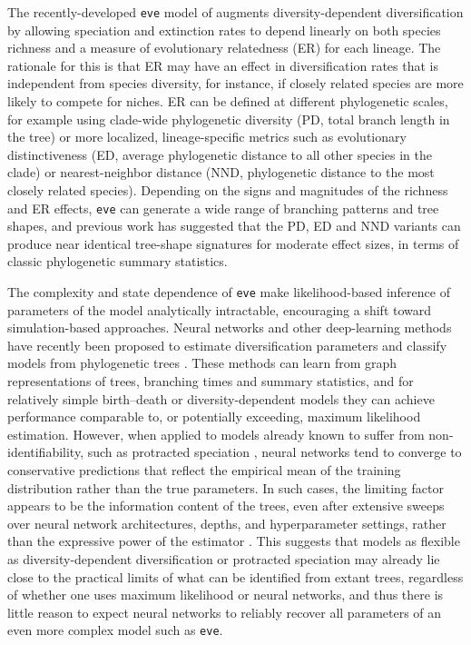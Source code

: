 {The recently-developed \texttt{eve} model of \citet{qin_impact_2025} augments diversity-dependent diversification by allowing speciation and extinction rates to depend linearly on both species richness and a measure of evolutionary relatedness (ER) for each lineage. The rationale for this is that ER may have an effect in diversification rates that is independent from species diversity, for instance, if closely related species are more likely to compete for niches. ER can be defined at different phylogenetic scales, for example using clade-wide phylogenetic diversity (PD, total branch length in the tree) or more localized, lineage-specific metrics such as evolutionary distinctiveness (ED, average phylogenetic distance to all other species in the clade) or nearest-neighbor distance (NND, phylogenetic distance to the most closely related species). Depending on the signs and magnitudes of the richness and ER effects, \texttt{eve} can generate a wide range of branching patterns and tree shapes, and previous work has suggested that the PD, ED and NND variants can produce near identical tree-shape signatures for moderate effect sizes, in terms of classic phylogenetic summary statistics. 

The complexity and state dependence of \texttt{eve} make likelihood-based inference of parameters of the model analytically intractable, encouraging a shift toward simulation-based approaches. Neural networks and other deep-learning methods have recently been proposed to estimate diversification parameters and classify models from phylogenetic trees \citep{lajaaiti_comparison_2023, voznica_deep_2022, lambert_deep_2023, qin_parameter_2025}. These methods can learn from graph representations of trees, branching times and summary statistics, and for relatively simple birth--death or diversity-dependent models they can achieve performance comparable to, or potentially exceeding, maximum likelihood estimation. However, when applied to models already known to suffer from non-identifiability, such as protracted speciation \citep{etienne_estimating_2014}, neural networks tend to converge to conservative predictions that reflect the empirical mean of the training distribution rather than the true parameters. In such cases, the limiting factor appears to be the information content of the trees, even after extensive sweeps over neural network architectures, depths, and hyperparameter settings, rather than the expressive power of the estimator \citep{qin_parameter_2025}. This suggests that models as flexible as diversity-dependent diversification or protracted speciation may already lie close to the practical limits of what can be identified from extant trees, regardless of whether one uses maximum likelihood or neural networks, and thus there is little reason to expect neural networks to reliably recover all parameters of an even more complex model such as \texttt{eve}.

}
